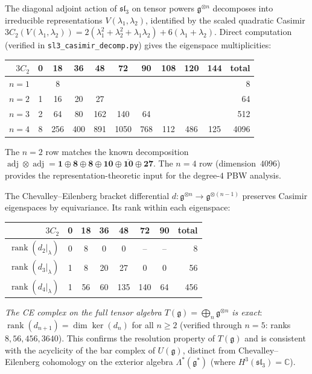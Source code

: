 \begin{computation}
\label{comp:sl3-casimir-decomp}

The diagonal adjoint action of $\mathfrak{sl}_3$ on tensor powers
$\mathfrak{g}^{\otimes n}$ decomposes into irreducible representations
$V(\lambda_1, \lambda_2)$, identified by the scaled quadratic Casimir
$3C_2(V(\lambda_1,\lambda_2)) = 2(\lambda_1^2 + \lambda_2^2 + \lambda_1\lambda_2) + 6(\lambda_1 + \lambda_2)$.
Direct computation (verified in \texttt{sl3\_casimir\_decomp.py})
gives the eigenspace multiplicities:
\begin{center}
\begin{tabular}{r|ccccccccc|r}
$3C_2$ & 0 & 18 & 36 & 48 & 72 & 90 & 108 & 120 & 144 & total \\
\hline
$n=1$ & & 8 & & & & & & & & 8 \\
$n=2$ & 1 & 16 & 20 & 27 & & & & & & 64 \\
$n=3$ & 2 & 64 & 80 & 162 & 140 & 64 & & & & 512 \\
$n=4$ & 8 & 256 & 400 & 891 & 1050 & 768 & 112 & 486 & 125 & 4096
\end{tabular}
\end{center}
The $n=2$ row matches the known decomposition
$\operatorname{adj} \otimes \operatorname{adj}
= \mathbf{1} \oplus \mathbf{8} \oplus \mathbf{8}
\oplus \mathbf{10} \oplus \overline{\mathbf{10}} \oplus \mathbf{27}$.
The $n=4$ row (dimension~$4096$) provides the representation-theoretic
input for the degree-$4$ PBW analysis.

The Chevalley--Eilenberg bracket differential
$d\colon \mathfrak{g}^{\otimes n} \to \mathfrak{g}^{\otimes (n-1)}$
preserves Casimir eigenspaces by equivariance.  Its rank within each eigenspace:
\begin{center}
\begin{tabular}{r|cccccc|r}
$3C_2$ & 0 & 18 & 36 & 48 & 72 & 90 & total \\
\hline
$\operatorname{rank}(d_2|_\lambda)$ & 0 & 8 & 0 & 0 & -- & -- & 8 \\
$\operatorname{rank}(d_3|_\lambda)$ & 1 & 8 & 20 & 27 & 0 & 0 & 56 \\
$\operatorname{rank}(d_4|_\lambda)$ & 1 & 56 & 60 & 135 & 140 & 64 & 456 \\
\end{tabular}
\end{center}
\emph{The CE complex on the full tensor algebra
$T(\mathfrak{g}) = \bigoplus_n \mathfrak{g}^{\otimes n}$ is exact}:
$\operatorname{rank}(d_{n+1}) = \dim \ker(d_n)$ for all $n \geq 2$
(verified through $n = 5$: ranks $8, 56, 456, 3640$).
This confirms the resolution property of $T(\mathfrak{g})$
and is consistent with the acyclicity of the bar complex of $U(\mathfrak{g})$,
distinct from Chevalley--Eilenberg cohomology on the exterior algebra
$\Lambda^*(\mathfrak{g}^*)$ (where $H^3(\mathfrak{sl}_3) = \mathbb{C}$).


\end{computation}
